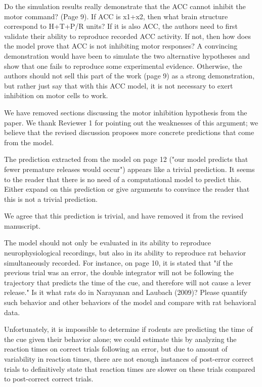 \documentclass[11pt,paper=letter]{scrartcl}
\begin{document}
\begin{quoting}
  Do the simulation results really demonstrate that the ACC cannot
  inhibit the motor command? (Page 9). If ACC is x1+x2, then what
  brain structure correspond to H+T+P/R units? If it is also ACC, the
  authors need to first validate their ability to reproduce recorded
  ACC activity. If not, then how does the model prove that ACC is not
  inhibiting motor responses? A convincing demonstration would have
  been to simulate the two alternative hypotheses and show that one
  fails to reproduce some experimental evidence. Otherwise, the
  authors should not sell this part of the work (page 9) as a strong
  demonstration, but rather just say that with this ACC model, it is
  not necessary to exert inhibition on motor cells to work.
\end{quoting}

We have removed sections
discussing the motor inhibition hypothesis
from the paper.
We thank Reviewer 1 for pointing out
the weaknesses of this argument;
we believe that the revised discussion
proposes more concrete predictions
that come from the model.

\begin{quoting}
  The prediction extracted from the model on page 12 ("our model
  predicts that fewer premature releases would occur") appears like a
  trivial prediction. It seems to the reader that there is no need of
  a computational model to predict this. Either expand on this
  prediction or give arguments to convince the reader that this is not
  a trivial prediction.
\end{quoting}

We agree that this prediction is trivial,
and have removed it from the revised manuscript.

\begin{quoting}
  The model should not only be evaluated in its ability to reproduce
  neurophysiological recordings, but also in its ability to reproduce
  rat behavior simultaneously recorded. For instance, on page 10, it
  is stated that "if the previous trial was an error, the double
  integrator will not be following the trajectory that predicts the
  time of the cue, and therefore will not cause a lever release." Is
  it what rats do in Narayanan and Laubach (2009)? Please quantify
  such behavior and other behaviors of the model and compare with rat
  behavioral data.
\end{quoting}

Unfortunately, it is impossible to determine if rodents
are predicting the time of the cue given their behavior alone;
we could estimate this by analyzing
the reaction times on correct trials
following an error,
but due to amount of variability in reaction times,
there are not enough instances of post-error correct trials
to definitively state that reaction times are slower
on these trials compared to post-correct correct trials.
\end{document}
